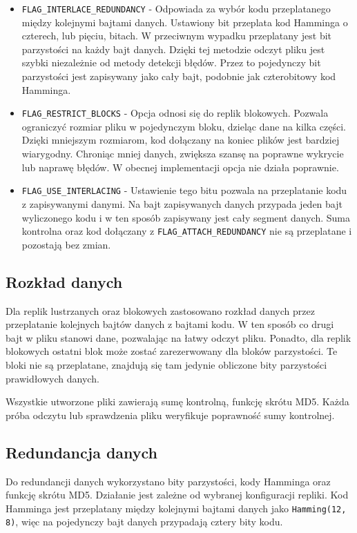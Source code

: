 \begin{itemize}
    \item \verb|FLAG_INTERLACE_REDUNDANCY| - Odpowiada za wybór kodu przeplatanego między kolejnymi bajtami danych. Ustawiony bit przeplata kod Hamminga o czterech, lub pięciu, bitach. W przeciwnym wypadku przeplatany jest bit parzystości na każdy bajt danych. Dzięki tej metodzie odczyt pliku jest szybki niezależnie od metody detekcji błędów. Przez to pojedynczy bit parzystości jest zapisywany jako cały bajt, podobnie jak czterobitowy kod Hamminga. 
    \item \verb|FLAG_RESTRICT_BLOCKS| - Opcja odnosi się do replik blokowych. Pozwala ograniczyć rozmiar pliku w pojedynczym bloku, dzieląc dane na kilka części. Dzięki mniejszym rozmiarom, kod dołączany na koniec plików jest bardziej wiarygodny. Chroniąc mniej danych, zwiększa szansę na poprawne wykrycie lub naprawę błędów. W obecnej implementacji opcja nie działa poprawnie.
    \item \verb|FLAG_USE_INTERLACING| - Ustawienie tego bitu pozwala na przeplatanie kodu z zapisywanymi danymi. Na bajt zapisywanych danych przypada jeden bajt wyliczonego kodu i w ten sposób zapisywany jest cały segment danych. Suma kontrolna oraz kod dołączany z \verb|FLAG_ATTACH_REDUNDANCY| nie są przeplatane i pozostają bez zmian.

\end{itemize}
\subsection {Rozkład danych}
Dla replik lustrzanych oraz blokowych zastosowano rozkład danych przez przeplatanie kolejnych bajtów danych z bajtami kodu. W ten sposób co drugi bajt w pliku stanowi dane, pozwalając na łatwy odczyt pliku. Ponadto, dla replik blokowych ostatni blok może zostać zarezerwowany dla bloków parzystości. Te bloki nie są przeplatane, znajdują się tam jedynie obliczone bity parzystości prawidłowych danych.

Wszystkie utworzone pliki zawierają sumę kontrolną, funkcję skrótu MD5. Każda próba odczytu lub sprawdzenia pliku weryfikuje poprawność sumy kontrolnej.

\subsection{Redundancja danych}
Do redundancji danych wykorzystano bity parzystości, kody Hamminga oraz funkcję skrótu MD5. Działanie jest zależne od wybranej konfiguracji repliki. Kod Hamminga jest przeplatany między kolejnymi bajtami danych jako \verb|Hamming(12, 8)|, więc na pojedynczy bajt danych przypadają cztery bity kodu. 

